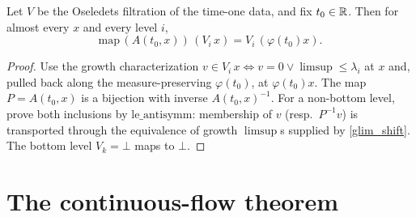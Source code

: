 \begin{theorem}\label{ae_flow_equivariant}
  \leanok
  Let \( V \) be the Oseledets filtration of the time-one data, and fix \( t_0 \in \mathbb{R} \). Then for
  almost every \( x \) and every level \( i \),
  \[ \mathrm{map}\,(A(t_0,x))\,(V_i\, x) = V_i\,(\varphi(t_0)x). \]
\end{theorem}
\begin{proof}\leanok
  Use the growth characterization \( v \in V_i\,x \iff v = 0 \lor \limsup \le \lambda_i \) at
  \( x \) and, pulled back along the measure-preserving \( \varphi(t_0) \), at \( \varphi(t_0)x \).
  The map \( P = A(t_0,x) \) is a bijection with inverse \( A(t_0,x)^{-1} \). For a non-bottom
  level, prove both inclusions by \( \mathrm{le\_antisymm} \): membership of \( v \) (resp.\
  \( P^{-1}v \)) is transported through the equivalence of growth \( \limsup \)s supplied by
  \ref{glim_shift}. The bottom level \( V_k = \bot \) maps to \( \bot \).
\end{proof}

\section{The continuous-flow theorem}

